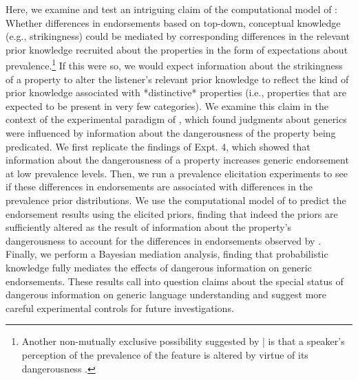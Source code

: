 \documentclass[floatsintext, 11pt, doc]{apa6}
\begin{document}
Here, we examine and test an intriguing claim of the computational model of : Whether differences in endorsements based on top-down, conceptual knowledge (e.g., strikingness) could be mediated by corresponding differences in the relevant prior knowledge recruited about the properties in the form of expectations about prevalence.\footnote{
  Another non-mutually exclusive possibility suggested by | is that a speaker's perception of the prevalence of the feature is altered by virtue of its dangerousness \cite{Rothbart1978}.
}
If this were so, we would expect information about the strikingness of a property to alter the listener's relevant prior knowledge to reflect the kind of prior knowledge associated with *distinctive* properties (i.e., properties that are expected to be present in very few categories).
We examine this claim in the context of the experimental paradigm of , which found judgments about generics were influenced by information about the dangerousness of the property being predicated. 
We first replicate the findings of  Expt. 4, which showed that information about the dangerousness of a property increases generic endorsement at low prevalence levels.
Then, we run a prevalence elicitation experiments to see if these differences in endorsements are associated with differences in the prevalence prior distributions.
We use the computational model of  to predict the endorsement results using the elicited priors, finding that indeed the priors are sufficiently altered as the result of information about the property's dangerousness to account for the differences in endorsements observed by .
Finally, we perform a Bayesian mediation analysis, finding that probabilistic knowledge fully mediates the effects of dangerous information on generic endorsements.
These results call into question claims about the special status of dangerous information on generic language understanding and suggest more careful experimental controls for future investigations.



\setlength{\bibleftmargin}{.125in}
\setlength{\bibindent}{-\bibleftmargin}


\end{document}
